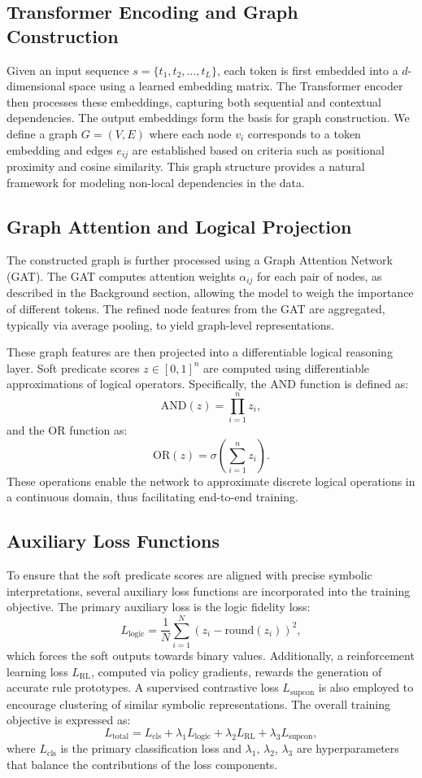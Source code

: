\documentclass{article}
\begin{document}
\subsection{Transformer Encoding and Graph Construction}
Given an input sequence \( s=\{t_1,t_2,\dots,t_L\} \), each token is first embedded into a \(d\)-dimensional space using a learned embedding matrix. The Transformer encoder then processes these embeddings, capturing both sequential and contextual dependencies. The output embeddings form the basis for graph construction. We define a graph \( G=(V,E) \) where each node \( v_i \) corresponds to a token embedding and edges \( e_{ij} \) are established based on criteria such as positional proximity and cosine similarity. This graph structure provides a natural framework for modeling non-local dependencies in the data.

\subsection{Graph Attention and Logical Projection}
The constructed graph is further processed using a Graph Attention Network (GAT). The GAT computes attention weights \(\alpha_{ij}\) for each pair of nodes, as described in the Background section, allowing the model to weigh the importance of different tokens. The refined node features from the GAT are aggregated, typically via average pooling, to yield graph-level representations.

These graph features are then projected into a differentiable logical reasoning layer. Soft predicate scores \(z \in [0,1]^n\) are computed using differentiable approximations of logical operators. Specifically, the \(\text{AND}\) function is defined as:
\[
\text{AND}(z)=\prod_{i=1}^{n}z_i,
\]
and the \(\text{OR}\) function as:
\[
\text{OR}(z)=\sigma\left(\sum_{i=1}^{n}z_i\right).
\]
These operations enable the network to approximate discrete logical operations in a continuous domain, thus facilitating end-to-end training.

\subsection{Auxiliary Loss Functions}
To ensure that the soft predicate scores are aligned with precise symbolic interpretations, several auxiliary loss functions are incorporated into the training objective. The primary auxiliary loss is the logic fidelity loss:
\[
L_{\text{logic}}=\frac{1}{N}\sum_{i=1}^{N}(z_i-\text{round}(z_i))^2,
\]
which forces the soft outputs towards binary values. Additionally, a reinforcement learning loss \(L_{\text{RL}}\), computed via policy gradients, rewards the generation of accurate rule prototypes. A supervised contrastive loss \(L_{\text{supcon}}\) is also employed to encourage clustering of similar symbolic representations. The overall training objective is expressed as:
\[
L_{\text{total}} = L_{\text{cls}} + \lambda_1 L_{\text{logic}} + \lambda_2 L_{\text{RL}} + \lambda_3 L_{\text{supcon}},
\]
where \(L_{\text{cls}}\) is the primary classification loss and \(\lambda_1\), \(\lambda_2\), \(\lambda_3\) are hyperparameters that balance the contributions of the loss components.
\end{document}
